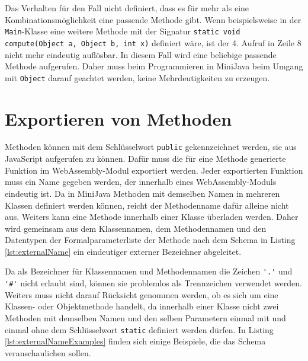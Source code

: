 Das Verhalten für den Fall nicht definiert, dass es für mehr als eine Kombinationsmöglichkeit eine passende Methode gibt. Wenn beispielsweise in der \lstinline{Main}-Klasse eine weitere Methode mit der Signatur \lstinline{static void compute(Object a, Object b, int x)} definiert wäre, ist der 4. Aufruf in Zeile 8 nicht mehr eindeutig auflösbar. In diesem Fall wird eine beliebige passende Methode aufgerufen. Daher muss beim Programmieren in MiniJava beim Umgang mit \lstinline{Object} darauf geachtet werden, keine Mehrdeutigkeiten zu erzeugen.

\section{Exportieren von Methoden}
\label{sec:Exportieren-von-Methoden}

Methoden können mit dem Schlüsselwort \lstinline{public} gekennzeichnet werden, sie aus JavaScript aufgerufen zu können. Dafür muss die für eine Methode generierte Funktion im WebAssembly-Modul exportiert werden. Jeder exportierten Funktion muss ein Name gegeben werden, der innerhalb eines WebAssembly-Moduls eindeutig ist. Da in MiniJava Methoden mit demselben Namen in mehreren Klassen definiert werden können, reicht der Methodenname dafür alleine nicht aus. Weiters kann eine Methode innerhalb einer Klasse überladen werden. Daher wird gemeinsam aus dem Klassennamen, dem Methodennamen und den Datentypen der Formalparameterliste der Methode nach dem Schema in Listing \ref{lst:externalName} ein eindeutiger externer Bezeichner abgeleitet.



Da als Bezeichner für Klassennamen und Methodennamen die Zeichen \lstinline{'.'} und \lstinline{'#'} nicht erlaubt sind, können sie problemlos als Trennzeichen verwendet werden. Weiters muss nicht darauf Rücksicht genommen werden, ob es sich um eine Klassen- oder Objektmethode handelt, da innerhalb einer Klasse nicht zwei Methoden mit demselben Namen und den selben Parametern einmal mit und einmal ohne dem Schlüsselwort \lstinline{static} definiert werden dürfen. In Listing \ref{lst:externalNameExamples} finden sich einige Beispiele, die das Schema veranschaulichen sollen.



